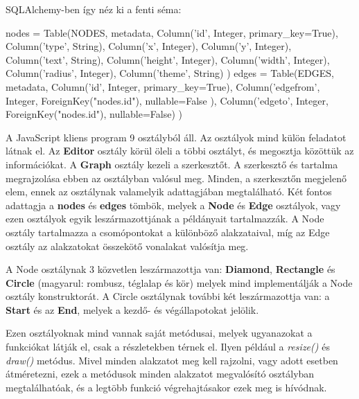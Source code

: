 SQLAlchemy-ben így néz ki a fenti séma:

\begin{python}
            nodes = Table(NODES, metadata,
                        Column('id', Integer, primary_key=True),
                        Column('type', String),
                        Column('x', Integer),
                        Column('y', Integer),
                        Column('text', String),
                        Column('height', Integer),
                        Column('width', Integer),
                        Column('radius', Integer),
                        Column('theme', String)
                        )
            edges = Table(EDGES, metadata,
                        Column('id', Integer, primary_key=True),
                        Column('edgefrom', Integer, 
ForeignKey("nodes.id"), nullable=False ),
                        Column('edgeto', Integer, 
ForeignKey("nodes.id"), nullable=False)
                        ) 
\end{python}

\newpage

A JavaScript kliens program 9 osztályból áll. Az osztályok mind külön feladatot látnak el. Az \textbf{Editor} osztály körül öleli a többi osztályt, és megosztja közöttük az információkat. A \textbf{Graph} osztály kezeli a szerkesztőt. A szerkesztő és tartalma megrajzolása ebben az osztályban valósul meg. Minden, a szerkesztőn megjelenő elem, ennek az osztálynak valamelyik adattagjában megtalálható. Két fontos adattagja a \textbf{nodes} és \textbf{edges} tömbök, melyek a \textbf{Node} és \textbf{Edge} osztályok, vagy ezen osztályok egyik leszármazottjának a példányait tartalmazzák. A Node osztály tartalmazza a csomópontokat a különböző alakzataival, míg az Edge osztály az alakzatokat összekötő vonalakat valósítja meg.
 
A Node osztálynak 3 közvetlen leszármazottja van: \textbf{Diamond}, \textbf{Rectangle} és \textbf{Circle} (magyarul: rombusz, téglalap és kör) melyek mind implementálják a Node osztály konstruktorát. A Circle osztálynak további két leszármazottja van: a \textbf{Start} és az \textbf{End}, melyek a kezdő- és végállapotokat jelölik.

Ezen osztályoknak mind vannak saját metódusai, melyek ugyanazokat a funkciókat látják el, csak a részletekben térnek el. Ilyen például a \textit{resize()} és \textit{draw()} metódus. Mivel minden alakzatot meg kell rajzolni, vagy adott esetben átméretezni, ezek a metódusok minden alakzatot megvalósító osztályban megtalálhatóak, és a legtöbb funkció végrehajtásakor ezek meg is hívódnak.

